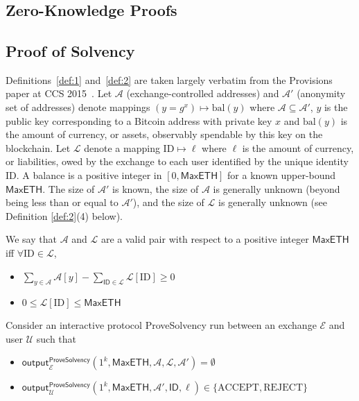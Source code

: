 
\chapter{}

\section{Zero-Knowledge Proofs}

\section{Proof of Solvency}
\label{app:defs}

Definitions~\ref{def:1} and~\ref{def:2} are taken largely verbatim from the Provisions paper at CCS 2015~\cite{provisions}. Let $\mathcal{A}$ (exchange-controlled addresses) and $\mathcal{A}'$ (anonymity set of addresses) denote mappings $(y = g^x) \mapsto \text{bal}(y)$ where $\mathcal{A} \subseteq \mathcal{A}'$, $y$ is the public key corresponding to a Bitcoin address with private key $x$ and $\text{bal}(y)$ is the amount of currency, or assets, observably spendable by this key on the blockchain. Let $\mathcal{L}$ denote a mapping $\text{ID} \mapsto \ell$ where $\ell$ is the amount of currency, or liabilities, owed by the exchange to each user identified by the unique identity ID. A balance is a positive integer in $[0,\mathsf{MaxETH}]$ for a known upper-bound $\mathsf{MaxETH}$. The size of $\mathcal{A}'$ is known, the size of $\mathcal{A}$ is generally unknown (beyond being less than or equal to $\mathcal{A}'$), and the size of $\mathcal{L}$ is generally unknown (see Definition \ref{def:2}(4) below). 

\begin{definition}
\label{def:1}

We say that $\mathcal{A}$ and $\mathcal{L}$ are a valid pair with respect to a positive integer $\mathsf{MaxETH}$ iff $\forall \text{ID} \in \mathcal{L}$,

\begin{itemize}
\item $\sum_{y \in \mathcal{A}} \mathcal{A}[y] - \sum_{\mathsf{ID} \in \mathcal{L}} \mathcal{L}[\text{ID}] \geq 0 \quad$
\item $0 \leq \mathcal{L}[\text{ID}] \leq \mathsf{MaxETH}$
\end{itemize}


Consider an interactive protocol ProveSolvency run between an exchange $\mathcal{E}$ and user $\mathcal{U}$ such that

\begin{itemize}
\item $\mathsf{output}_{\mathcal{E}}^{\mathsf{ProveSolvency}}(1^k, \mathsf{MaxETH}, \mathcal{A}, \mathcal{L}, \mathcal{A}') = \emptyset$
\item $\mathsf{output}_{\mathcal{U}}^{\mathsf{ProveSolvency}}(1^k, \mathsf{MaxETH}, \mathcal{A}', \mathsf{ID}, \ell) \in \{\text{ACCEPT}, \text{REJECT}\}$
\end{itemize}
   
\end{definition}

